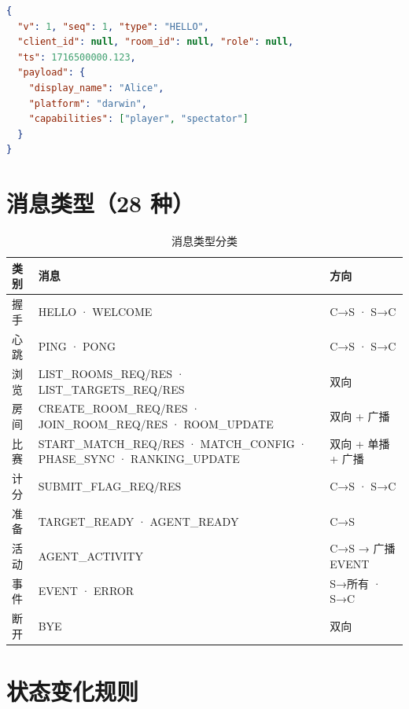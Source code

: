 \documentclass[12pt,a4paper]{ctexbook}
\begin{document}
\begin{lstlisting}[language=json,caption={HELLO 消息示例}]
{
  "v": 1, "seq": 1, "type": "HELLO",
  "client_id": null, "room_id": null, "role": null,
  "ts": 1716500000.123,
  "payload": {
    "display_name": "Alice",
    "platform": "darwin",
    "capabilities": ["player", "spectator"]
  }
}
\end{lstlisting}

\section{消息类型（28 种）}

\begin{table}[htbp]
\centering
\caption{消息类型分类}
\begin{tabular}{@{}lll@{}}
\toprule
\textbf{类别} & \textbf{消息} & \textbf{方向} \\
\midrule
握手 & HELLO · WELCOME & C→S · S→C \\
心跳 & PING · PONG & C→S · S→C \\
浏览 & LIST\_ROOMS\_REQ/RES · LIST\_TARGETS\_REQ/RES & 双向 \\
房间 & CREATE\_ROOM\_REQ/RES · JOIN\_ROOM\_REQ/RES · ROOM\_UPDATE & 双向 + 广播 \\
比赛 & START\_MATCH\_REQ/RES · MATCH\_CONFIG · PHASE\_SYNC · RANKING\_UPDATE & 双向 + 单播 + 广播 \\
计分 & SUBMIT\_FLAG\_REQ/RES & C→S · S→C \\
准备 & TARGET\_READY · AGENT\_READY & C→S \\
活动 & AGENT\_ACTIVITY & C→S → 广播 EVENT \\
事件 & EVENT · ERROR & S→所有 · S→C \\
断开 & BYE & 双向 \\
\bottomrule
\end{tabular}
\end{table}

\section{状态变化规则}
\end{document}
